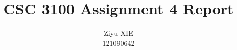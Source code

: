 \documentclass[a4paper,12pt]{article}
\begin{document}
\author{Ziyu XIE \\ 121090642}
\title{CSC 3100 Assignment 4 Report}

\maketitle






\end{document}
